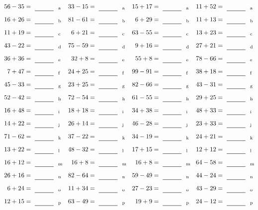 \documentclass
[
  draft    = true,
  fontsize = 11pt,
  parskip  = half-
]
{scrartcl}
\begin{document}
\clearpage
\begin{align*}
    \pline{56-35}&=\rline{a}
  & \pline{33-15}&=\rline{a}
  & \pline{15+17}&=\rline{a}
  & \pline{11+52}&=\rline{a} \\[1ex]
    \pline{16+26}&=\rline{b}
  & \pline{81-61}&=\rline{b}
  & \pline{6+29}&=\rline{b}
  & \pline{11+13}&=\rline{b} \\[1ex]
    \pline{11+19}&=\rline{c}
  & \pline{6+21}&=\rline{c}
  & \pline{63-55}&=\rline{c}
  & \pline{13+23}&=\rline{c} \\[1ex]
    \pline{43-22}&=\rline{d}
  & \pline{75-59}&=\rline{d}
  & \pline{9+16}&=\rline{d}
  & \pline{27+21}&=\rline{d} \\[1ex]
    \pline{36+36}&=\rline{e}
  & \pline{32+8}&=\rline{e}
  & \pline{55+8}&=\rline{e}
  & \pline{78-66}&=\rline{e} \\[1ex]
    \pline{7+47}&=\rline{f}
  & \pline{24+25}&=\rline{f}
  & \pline{99-91}&=\rline{f}
  & \pline{38+18}&=\rline{f} \\[1ex]
    \pline{45-33}&=\rline{g}
  & \pline{23+25}&=\rline{g}
  & \pline{82-66}&=\rline{g}
  & \pline{43-31}&=\rline{g} \\[1ex]
    \pline{52-42}&=\rline{h}
  & \pline{72-54}&=\rline{h}
  & \pline{61-55}&=\rline{h}
  & \pline{29+25}&=\rline{h} \\[1ex]
    \pline{16+48}&=\rline{i}
  & \pline{18+18}&=\rline{i}
  & \pline{34+38}&=\rline{i}
  & \pline{48+33}&=\rline{i} \\[1ex]
    \pline{14+22}&=\rline{j}
  & \pline{26+14}&=\rline{j}
  & \pline{46-28}&=\rline{j}
  & \pline{23+33}&=\rline{j} \\[1ex]
    \pline{71-62}&=\rline{k}
  & \pline{37-22}&=\rline{k}
  & \pline{34-19}&=\rline{k}
  & \pline{24+21}&=\rline{k} \\[1ex]
    \pline{13+22}&=\rline{l}
  & \pline{48-32}&=\rline{l}
  & \pline{17+15}&=\rline{l}
  & \pline{12+12}&=\rline{l} \\[1ex]
    \pline{16+12}&=\rline{m}
  & \pline{16+8}&=\rline{m}
  & \pline{16+8}&=\rline{m}
  & \pline{64-58}&=\rline{m} \\[1ex]
    \pline{26+16}&=\rline{n}
  & \pline{82-64}&=\rline{n}
  & \pline{59-49}&=\rline{n}
  & \pline{44-24}&=\rline{n} \\[1ex]
    \pline{6+24}&=\rline{o}
  & \pline{11+34}&=\rline{o}
  & \pline{27-23}&=\rline{o}
  & \pline{43-29}&=\rline{o} \\[1ex]
    \pline{12+15}&=\rline{p}
  & \pline{63-49}&=\rline{p}
  & \pline{19+9}&=\rline{p}
  & \pline{24-12}&=\rline{p}
\end{align*}
\end{document}
